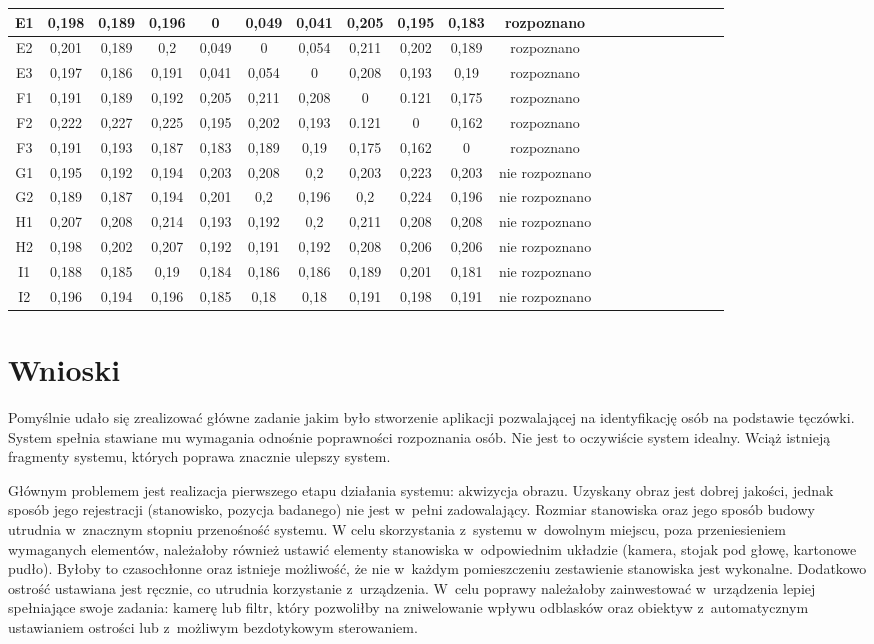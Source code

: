\begin{table}
\begin{center}
\begin{tabular}{|c|c|c|c|c|c|c|c|c|c|c|c|c|c|c|c|c|c|c|l|}
E1 & 0,198&0,189&0,196&0&0,049&0,041&0,205&0,195&0,183 & rozpoznano\\ \hline
E2 & 0,201&0,189&0,2&0,049&0&0,054&0,211&0,202&0,189 & rozpoznano\\ \hline
E3 & 0,197&0,186&0,191&0,041&0,054&0&0,208&0,193&0,19 & rozpoznano\\ \hline
F1 & 0,191&0,189&0,192&0,205&0,211&0,208&0&0.121&0,175 & rozpoznano\\ \hline
F2 & 0,222&0,227&0,225&0,195&0,202&0,193&0.121&0&0,162 & rozpoznano\\ \hline
F3 & 0,191&0,193&0,187&0,183&0,189&0,19&0,175&0,162&0 & rozpoznano\\ \hline
G1 & 0,195&0,192&0,194&0,203&0,208&0,2&0,203&0,223&0,203 & nie rozpoznano\\ \hline
G2 & 0,189&0,187&0,194&0,201&0,2&0,196&0,2&0,224&0,196 & nie rozpoznano\\ \hline
H1 & 0,207&0,208&0,214&0,193&0,192&0,2&0,211&0,208&0,208 & nie rozpoznano\\ \hline
H2 & 0,198&0,202&0,207&0,192&0,191&0,192&0,208&0,206&0,206 & nie rozpoznano\\ \hline
I1 & 0,188&0,185&0,19&0,184&0,186&0,186&0,189&0,201&0,181 & nie rozpoznano\\ \hline
I2 & 0,196&0,194&0,196&0,185&0,18&0,18&0,191&0,198&0,191 & nie rozpoznano\\ \hline
\end{tabular}
\end{center}
\end{table}

\section{Wnioski}
\label{sec:wnioski}

Pomyślnie udało się zrealizować główne zadanie jakim było stworzenie aplikacji pozwalającej na identyfikację osób na podstawie tęczówki. System spełnia stawiane mu wymagania odnośnie poprawności rozpoznania osób. Nie jest to oczywiście system idealny. Wciąż istnieją fragmenty systemu, których poprawa znacznie ulepszy system.

Głównym problemem jest realizacja pierwszego etapu działania systemu: akwizycja obrazu. Uzyskany obraz jest dobrej jakości, jednak sposób jego  rejestracji (stanowisko, pozycja badanego) nie jest w~pełni zadowalający. Rozmiar stanowiska oraz jego sposób budowy utrudnia w~znacznym stopniu przenośność systemu. W celu skorzystania z~systemu w~dowolnym miejscu, poza przeniesieniem wymaganych elementów, należałoby również ustawić elementy stanowiska w~odpowiednim układzie (kamera, stojak pod głowę, kartonowe pudło). Byłoby to czasochłonne oraz istnieje możliwość, że nie w~każdym pomieszczeniu zestawienie stanowiska jest wykonalne. Dodatkowo ostrość ustawiana jest ręcznie, co utrudnia korzystanie z~urządzenia. W~celu poprawy należałoby zainwestować w~urządzenia lepiej spełniające swoje zadania: kamerę lub filtr, który pozwoliłby na zniwelowanie wpływu odblasków oraz obiektyw z~automatycznym ustawianiem ostrości lub z~możliwym bezdotykowym sterowaniem.

